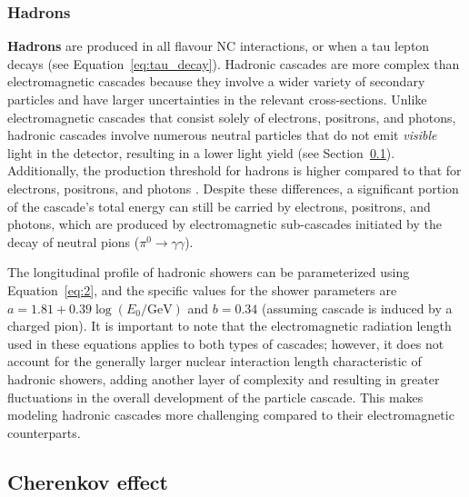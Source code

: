 \subsubsection{Hadrons}
\label{sec:hadrons_inice}

\textbf{Hadrons} are produced in all flavour NC interactions, or when a tau lepton decays (see Equation~\ref{eq:tau_decay}). Hadronic cascades are more complex than electromagnetic cascades because they involve a wider variety of secondary particles and have larger uncertainties in the relevant cross-sections. Unlike electromagnetic cascades that consist solely of electrons, positrons, and photons, hadronic cascades involve numerous neutral particles that do not emit \emph{visible} light in the detector, resulting in a lower light yield (see Section~\ref{sec:cherenkov}). Additionally, the production threshold for hadrons is higher compared to that for electrons, positrons, and photons . Despite these differences, a significant portion of the cascade’s total energy can still be carried by electrons, positrons, and photons, which are produced by electromagnetic sub-cascades initiated by the decay of neutral pions ($\pi^0 \rightarrow \gamma\gamma$). 

The longitudinal profile of hadronic showers can be parameterized using Equation~\ref{eq:2}, and the specific values for the shower parameters are $a = 1.81 + 0.39 \log(E_0/\text{GeV})$ and $b = 0.34$ (assuming cascade is induced by a charged pion). It is important to note that the electromagnetic radiation length used in these equations applies to both types of cascades; however, it does not account for the generally larger nuclear interaction length characteristic of hadronic showers, adding another layer of complexity and resulting in greater fluctuations in the overall development of the particle cascade. This makes modeling hadronic cascades more challenging compared to their electromagnetic counterparts.

\subsection{Cherenkov effect}
\label{sec:cherenkov}

